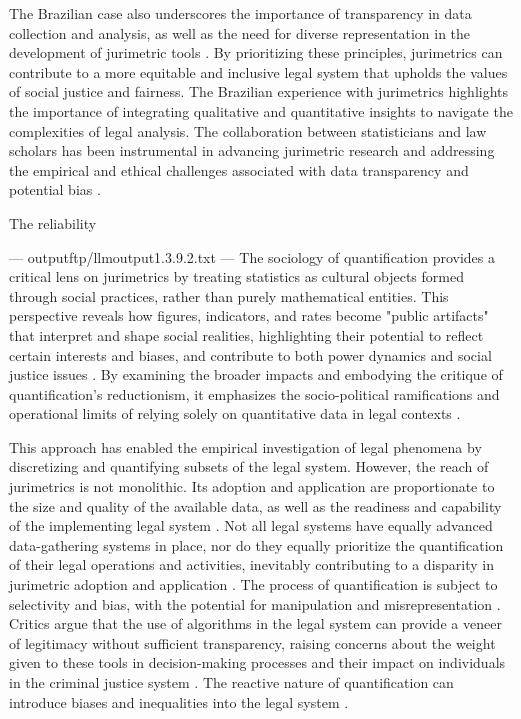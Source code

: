 The Brazilian case also underscores the importance of transparency in data collection and analysis, as well as the need for diverse representation in the development of jurimetric tools \cite{10.1590/dados.2022.65.3.267,10.1007/978-3-319-44000-215}. By prioritizing these principles, jurimetrics can contribute to a more equitable and inclusive legal system that upholds the values of social justice and fairness. The Brazilian experience with jurimetrics highlights the importance of integrating qualitative and quantitative insights to navigate the complexities of legal analysis. The collaboration between statisticians and law scholars has been instrumental in advancing jurimetric research and addressing the empirical and ethical challenges associated with data transparency and potential bias \cite{10.1007/s11186-021-09453-1,10.3390/fi9040068}.

The reliability


---
outputftp/llmoutput1.3.9.2.txt
---
The sociology of quantification provides a critical lens on jurimetrics by treating statistics as cultural objects formed through social practices, rather than purely mathematical entities. This perspective reveals how figures, indicators, and rates become "public artifacts" that interpret and shape social realities, highlighting their potential to reflect certain interests and biases, and contribute to both power dynamics and social justice issues \cite{camargo2021,paiva2021}. By examining the broader impacts and embodying the critique of quantification’s reductionism, it emphasizes the socio-political ramifications and operational limits of relying solely on quantitative data in legal contexts \cite{sousa2024,saltelli2020}.

This approach has enabled the empirical investigation of legal phenomena by discretizing and quantifying subsets of the legal system. However, the reach of jurimetrics is not monolithic. Its adoption and application are proportionate to the size and quality of the available data, as well as the readiness and capability of the implementing legal system \cite{losano2006}. Not all legal systems have equally advanced data-gathering systems in place, nor do they equally prioritize the quantification of their legal operations and activities, inevitably contributing to a disparity in jurimetric adoption and application \cite{losano2006}. The process of quantification is subject to selectivity and bias, with the potential for manipulation and misrepresentation \cite{losano2006}. Critics argue that the use of algorithms in the legal system can provide a veneer of legitimacy without sufficient transparency, raising concerns about the weight given to these tools in decision-making processes and their impact on individuals in the criminal justice system \cite{losano2006}. The reactive nature of quantification can introduce biases and inequalities into the legal system \cite{losano2006}.

